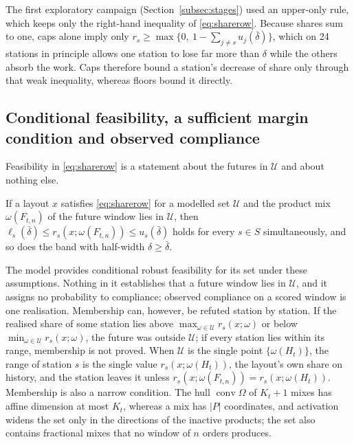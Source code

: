 The first exploratory campaign (Section~\ref{subsec:stages}) used an upper-only rule, which keeps only the right-hand inequality of \eqref{eq:sharerow}. Because shares sum to one, caps alone imply only $r_s\ge\max\{0,\ 1-\sum_{j\ne s}u_j(\bar\delta)\}$, which on 24 stations in principle allows one station to lose far more than $\delta$ while the others absorb the work. Caps therefore bound a station's decrease of share only through that weak inequality, whereas floors bound it directly.

\subsection{Conditional feasibility, a sufficient margin condition and observed compliance}\label{subsec:conditional}
Feasibility in \eqref{eq:sharerow} is a statement about the futures in $\mathcal U$ and about nothing else.

\begin{proposition}
If a layout $x$ satisfies \eqref{eq:sharerow} for a modelled set $\mathcal U$ and the product mix $\omega(F_{t,n})$ of the future window lies in $\mathcal U$, then $\ell_s(\bar\delta)\le r_s(x;\omega(F_{t,n}))\le u_s(\bar\delta)$ holds for every $s\in S$ simultaneously, and so does the band with half-width $\delta\ge\bar\delta$.
\end{proposition}

The model provides conditional robust feasibility for its set under these assumptions. Nothing in it establishes that a future window lies in $\mathcal U$, and it assigns no probability to compliance; observed compliance on a scored window is one realisation. Membership can, however, be refuted station by station. If the realised share of some station lies above $\max_{\omega\in\mathcal U}r_s(x;\omega)$ or below $\min_{\omega\in\mathcal U}r_s(x;\omega)$, the future was outside $\mathcal U$; if every station lies within its range, membership is not proved. When $\mathcal U$ is the single point $\{\omega(H_t)\}$, the range of station $s$ is the single value $r_s(x;\omega(H_t))$, the layout's own share on history, and the station leaves it unless $r_s(x;\omega(F_{t,n}))=r_s(x;\omega(H_t))$. Membership is also a narrow condition. The hull $\operatorname{conv}\Omega$ of $K_t+1$ mixes has affine dimension at most $K_t$, whereas a mix has $|P|$ coordinates, and activation widens the set only in the directions of the inactive products; the set also contains fractional mixes that no window of $n$ orders produces.

